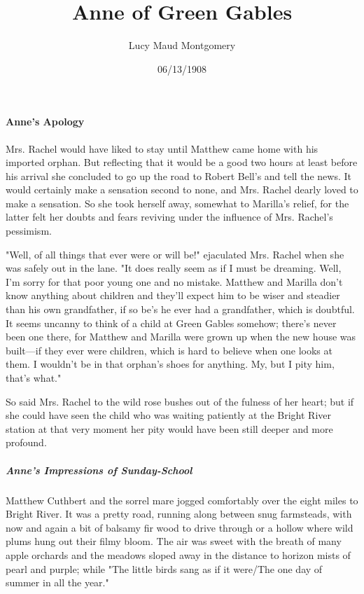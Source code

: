 \documentclass{article}
\title{Anne of Green Gables}
\author{Lucy Maud Montgomery}
\date{06/13/1908}
\begin{document}
\maketitle

\paragraph{Anne's Apology}
Mrs. Rachel would have liked to stay until Matthew came home with his imported orphan. But reflecting that it would be a good two hours at least before his arrival she concluded to go up the road to Robert Bell's and tell the news. It would certainly make a sensation second to none, and Mrs. Rachel dearly loved to make a sensation. So she took herself away, somewhat to Marilla's relief, for the latter felt her doubts and fears reviving under the influence of Mrs. Rachel's pessimism.

"Well, of all things that ever were or will be!" ejaculated Mrs. Rachel when she was safely out in the lane. "It does really seem as if I must be dreaming. Well, I'm sorry for that poor young one and no mistake. Matthew and Marilla don't know anything about children and they'll expect him to be wiser and steadier than his own grandfather, if so be's he ever had a grandfather, which is doubtful. It seems uncanny to think of a child at Green Gables somehow; there's never been one there, for Matthew and Marilla were grown up when the new house was built---if they ever were children, which is hard to believe when one looks at them. I wouldn't be in that orphan's shoes for anything. My, but I pity him, that's what."

So said Mrs. Rachel to the wild rose bushes out of the fulness of her heart; but if she could have seen the child who was waiting patiently at the Bright River station at that very moment her pity would have been still deeper and more profound.

\subparagraph{Anne's Impressions of Sunday-School}
Matthew Cuthbert and the sorrel mare jogged comfortably over the eight miles to Bright River. It was a pretty road, running along between snug farmsteads, with now and again a bit of balsamy fir wood to drive through or a hollow where wild plums hung out their filmy bloom. The air was sweet with the breath of many apple orchards and the meadows sloped away in the distance to horizon mists of pearl and purple; while "The little birds sang as if it were/The one day of summer in all the year."
\end{document}
